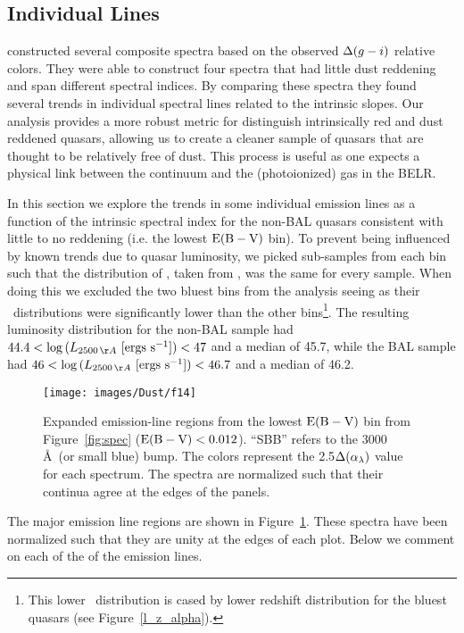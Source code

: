 \subsection{Individual Lines} \label{sec:indv_lines}
\citet{Richards:2003} constructed several composite spectra based on the observed $\Delta(g-i)$ relative colors. They were able to construct four spectra that had little dust reddening and span different spectral indices.  By comparing these spectra they found several trends in individual spectral lines related to the intrinsic slopes. Our analysis provides a more robust metric for distinguish intrinsically red and dust reddened quasars, allowing us to create a cleaner sample of quasars that are thought to be relatively free of dust. This process is useful as one expects a physical link between the continuum and the (photoionized) gas in the BELR.

In this section we explore the trends in some individual emission lines as a function of the intrinsic spectral index for the non-BAL quasars consistent with little to no reddening (i.e. the lowest ${\rm E(B-V)}$ bin).  To prevent being influenced by known trends due to quasar luminosity, we picked sub-samples from each bin such that the distribution of \ltwofive, taken from \citet{Krawczyk:2013}, was the same for every sample. When doing this we excluded the two bluest bins from the analysis seeing as their \ltwofive\ distributions were significantly lower than the other bins\footnote{This lower \ltwofive\ distribution is cased by lower redshift distribution for the bluest quasars (see Figure~\ref{l_z_alpha}).}.  The resulting luminosity distribution for the non-BAL sample had $44.4<\log{(L_{2500\,\AA}{\rm \ [ergs\ s^{-1}]})}<47$ and a median of 45.7, while the BAL sample had $46<\log{(L_{2500\,\AA}{\rm \ [ergs\ s^{-1}]})}<46.7$ and a median of 46.2.

\begin{figure*}[t]
\begin{center}
\texttt{[image: images/Dust/f14]}
\caption[Expanded emission-line regions for non-BAL quasars]{\label{fig:ind_spec} Expanded emission-line regions from the lowest ${\rm E(B-V)}$ bin from Figure~\ref{fig:spec} (${\rm E(B-V)}<0.012$). ``SBB'' refers to the 3000 \AA\ (or small blue) bump.  The colors represent the 2.5$\Delta(\alpha_{\lambda})$ value for each spectrum.  The spectra are normalized such that their continua agree at the edges of the panels.}
\end{center}
\end{figure*}

The major emission line regions are shown in Figure~\ref{fig:ind_spec}. These spectra have been normalized such that they are unity at the edges of each plot. Below we comment on each of the of the emission lines. %

